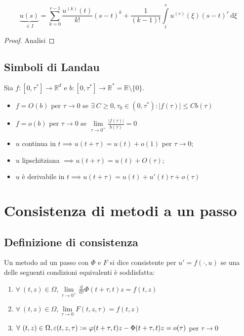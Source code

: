 \documentclass[hidelinks, 10pt]{report}
\begin{document}
\[ \underbrace{u(s)}_{\in I} = \sum\limits_{k = 0}^{r - 1} \frac{u^{(k)}(t)}{k!} (s - t)^{k} + \frac{1}{(k - 1)!} \int\limits_{t}^{s} u^{(r)} (\xi) (s - t)^{r} \, \mathrm{d}\xi \]

\begin{proof}
Analisi
\end{proof}

\subsection{Simboli di Landau}

Sia $ f: [0, \tau^{\ast}] \to \mathbb{R}^{d} $ e $ b: [0, \tau^{\ast}] \to \mathbb{R}^{\ast} = \mathbb{R} \setminus \{ 0 \} $.

\begin{itemize}
\item $ f = O (b) $ per $ \tau \to 0 $ se $ \exists\ C \ge 0, \tau_{0} \in (0, \tau^{\ast}) : \vert f(\tau) \vert \le C b(\tau) $
\item $ f = o(b) $ per $ \tau \to 0 $ se $ \lim\limits_{\tau \to 0^{+}} \frac{\vert f(\tau) \vert}{b(\tau)} = 0 $
\end{itemize}

\begin{es}
\noindent
\begin{itemize}
\item $ u $ continua in $ t \implies u(t + \tau) = u(t) + o(1) $ per $ \tau \to 0 $;
\item $ u $ lipschitziana $ \implies u(t + \tau) = u(t) + O(\tau) $;
\item $ u $ \`e derivabile in $ t \implies u(t + \tau) = u(t) + u'(t) \tau + o(\tau) $
\end{itemize}
\end{es}

\section{Consistenza di metodi a un passo}
\subsection{Definizione di consistenza}

Un metodo ad un passo con $ \Phi $ e $ F $ si dice consistente per $ u' = f(\cdot, u) $ se una delle seguenti condizioni equivalenti \`e soddisfatta:

\begin{enumerate}
\item $ \forall\ (t, z) \in \Omega, \lim\limits_{\tau \to 0^{+}} \frac{\mathrm{d}}{\mathrm{d} \tau} \Phi(t + \tau, t)z = f(t, z) $
\item $ \forall\ (t, z) \in \Omega, \lim\limits_{\tau \to 0} F(t, z, \tau) = f(t, z) $
\item $ \forall\ (t, z) \in \Omega, \varepsilon(t, z, \tau) \vcentcolon= \varphi(t + \tau, t)z - \Phi(t + \tau, t)z = o(\tau) $ per $ \tau \to 0 $
\end{enumerate}
\end{document}
